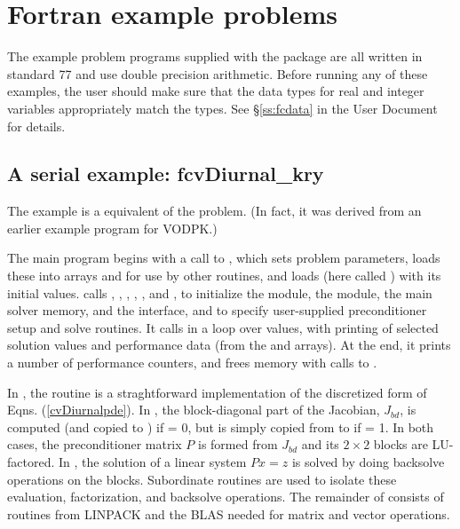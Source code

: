 \section{Fortran example problems}\label{s:ex_fortran}

The {\F} example problem programs supplied with the {\cvode}
package are all written in standard {\F}77 and use double precision
arithmetic.  Before running any of these examples, the user should
make sure that the {\F} data types for real and integer variables
appropriately match the {\CC} types.  See \S\ref{ss:fcdata} in the
{\cvode} User Document for details.

\subsection{A serial example: fcvDiurnal\_kry}\label{ss:fcvDiurnal} 
The  example is a {\F} equivalent of the  problem.
(In fact, it was derived from an earlier {\F} example program for VODPK.)

The main program begins with a call to , which sets problem
parameters, loads these into arrays  and  for use by other
routines, and loads  (here called ) with its initial values.
 calls , , , 
, , and ,
to initialize the {\nvecs} module, the {\sunlinsolspgmr} module, the
main solver memory, and the {\cvspils} interface, 
and to specify user-supplied preconditioner setup and solve routines.
It calls  in a loop over  values, with printing of
selected solution values and performance data (from the   and 
arrays).  At the end, it prints a number of performance counters, and
frees memory with calls to .

In , the  routine is a straghtforward implementation
of the discretized form of Eqns. (\ref{cvDiurnalpde}).  In , the
block-diagonal part of the Jacobian, $J_{bd}$, is computed (and copied to
) if  = 0, but is simply copied from  to  if
 = 1.  In both cases, the preconditioner matrix $P$ is formed from 
$J_{bd}$ and its $2 \times 2$ blocks are LU-factored.  In ,
the solution of a linear system $Px = z$ is solved by doing backsolve
operations on the blocks.  Subordinate routines are used to isolate
these evaluation, factorization, and backsolve operations.
The remainder of  consists of
routines from LINPACK and the BLAS needed for matrix and vector operations.

